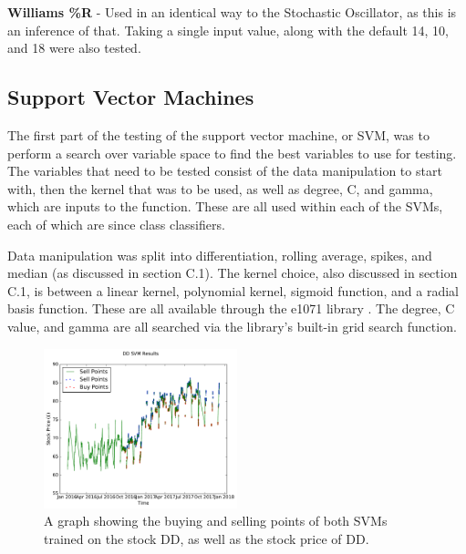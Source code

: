 \documentclass[conference]{IEEEtran}
\begin{document}
\textbf{Williams \%R} - Used in an identical way to the Stochastic Oscillator, as this is an inference of that. Taking a single input value, along with the default 14, 10, and 18 were also tested.

\subsection{Support Vector Machines}

The first part of the testing of the support vector machine, or SVM, was to perform a search over variable space to find the best variables to use for testing. The variables that need to be tested consist of the data manipulation to start with, then the kernel that was to be used, as well as degree, C, and gamma, which are inputs to the function. These are all used within each of the SVMs, each of which are since class classifiers. 

Data manipulation was split into differentiation, rolling average, spikes, and median (as discussed in section C.1). The kernel choice, also discussed in section C.1, is between a linear kernel, polynomial kernel, sigmoid function, and a radial basis function. These are all available through the e1071 library \cite{Meyer2017}. The degree, C value, and gamma are all searched via the library's built-in grid search function. 

\begin{figure}[H]
\includegraphics[width=0.5\textwidth, angle=0]{SVMResults.pdf}
\caption{A graph showing the buying and selling points of both SVMs trained on the stock DD, as well as the stock price of DD.}
\label{fig:SVMResults}
\end{figure}
\end{document}
